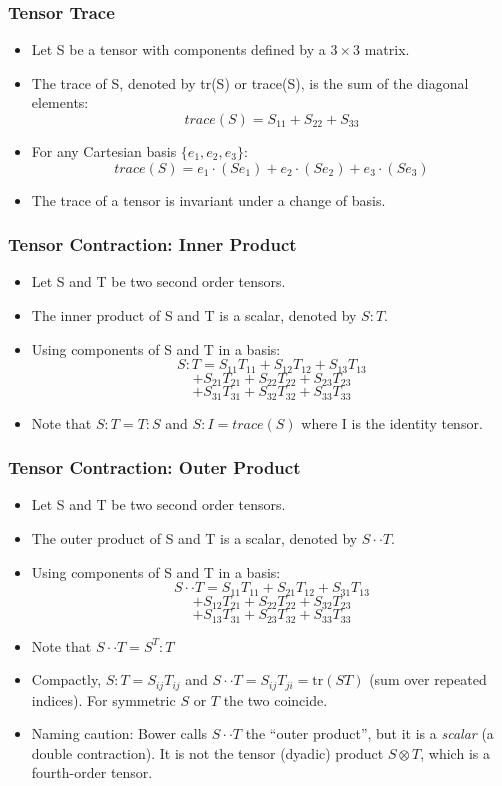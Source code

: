\documentclass[aspectratio=169,11pt]{beamer}
\begin{document}
\begin{frame}
\frametitle{Tensor Trace}
\begin{itemize}
    \item Let S be a tensor with components defined by a \(3 \times 3\) matrix. 
    \item The trace of S, denoted by tr(S) or trace(S), is the sum of the diagonal elements: 
    \[
    trace(S) = S_{11} + S_{22} + S_{33}
    \]
    \item For any Cartesian basis \(\{e_1, e_2, e_3\}\):
    \[
    trace(S) = e_1 \cdot (S e_1) + e_2 \cdot (S e_2) + e_3 \cdot (S e_3)
    \]
    \item The trace of a tensor is invariant under a change of basis. 
\end{itemize}
\end{frame}

\begin{frame}
\frametitle{Tensor Contraction: Inner Product}
\begin{itemize}
    \item Let S and T be two second order tensors. 
    \item The inner product of S and T is a scalar, denoted by \(S : T\). 
    \item Using components of S and T in a basis: 
    \[
    S : T = S_{11}T_{11} + S_{12}T_{12} + S_{13}T_{13}
    \]
    \[
    + S_{21}T_{21} + S_{22}T_{22} + S_{23}T_{23}
    \]
    \[
    + S_{31}T_{31} + S_{32}T_{32} + S_{33}T_{33}
    \]
    \item Note that \(S : T = T : S\) and \(S : I = trace(S)\) where I is the identity tensor. 
\end{itemize}
\end{frame}

\begin{frame}
\frametitle{Tensor Contraction: Outer Product}
\begin{itemize}
    \item Let S and T be two second order tensors. 
    \item The outer product of S and T is a scalar, denoted by \(S \cdot \cdot T\). 
    \item Using components of S and T in a basis:
    \[
    S \cdot \cdot T = S_{11}T_{11} + S_{21}T_{12} + S_{31}T_{13}
    \]
    \[
    + S_{12}T_{21} + S_{22}T_{22} + S_{32}T_{23}
    \]
    \[
    + S_{13}T_{31} + S_{23}T_{32} + S_{33}T_{33}
    \]
    \item Note that \(S \cdot \cdot T = S^T : T\)
    \item Compactly, \(S : T = S_{ij}T_{ij}\) and \(S\cdot\cdot T = S_{ij}T_{ji} = \mathrm{tr}(ST)\) (sum over repeated indices). For symmetric \(S\) or \(T\) the two coincide.
    \item Naming caution: Bower calls \(S\cdot\cdot T\) the ``outer product'', but it is a \emph{scalar} (a double contraction). It is not the tensor (dyadic) product \(S\otimes T\), which is a fourth-order tensor.
\end{itemize}
\end{frame}
\end{document}
